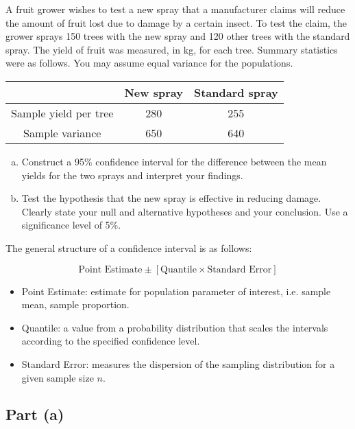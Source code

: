 \documentclass[a4paper,12pt]{article}
\begin{document}
\large \noindent A fruit grower wishes to test a new spray that a manufacturer claims will
reduce the amount of fruit lost due to damage by a certain insect. To test
the claim, the grower sprays 150 trees with the new spray and 120 other
trees with the standard spray. The yield of fruit was measured, in kg, for
each tree. Summary statistics were as follows. You may assume equal variance for the populations.

\begin{center}
\begin{tabular}{|c|c|c|} \hline 
                       & New spray & Standard spray\\ \hline 
Sample yield per tree  & 280       & 255\\ \hline 
Sample variance        & 650      & 640\\ \hline 
\end{tabular}
\end{center}
\begin{enumerate}[(a)]
\item Construct a 95\% confidence interval for the difference between the mean yields for the two sprays and interpret your findings. 
\item Test the hypothesis that the new spray is effective in reducing damage. Clearly state your null and alternative hypotheses and your conclusion. Use a significance level of 5\%.
\end{enumerate}



\begin{framed}
The general structure of a confidence interval is as follows:

\[ \mbox{Point Estimate}  \pm \left[ \mbox{Quantile} \times \mbox{Standard Error} \right] \]


\begin{itemize}
\item Point Estimate: estimate for population parameter of interest, i.e. sample mean, sample proportion.
\item Quantile: a value from a probability distribution that scales the intervals according to the specified confidence level.
\item Standard Error: measures the dispersion of the sampling distribution for a given sample size $n$.
\end{itemize}
\end{framed}

\subsection*{Part (a)}
\end{document}
